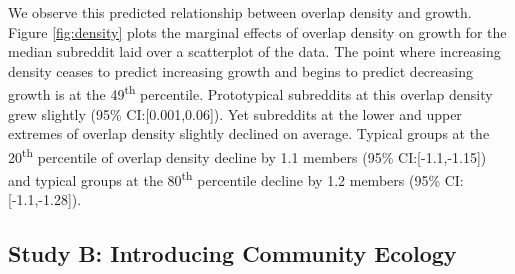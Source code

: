 \documentclass[letterpaper]{article}\usepackage[]{graphicx}\usepackage[]{color}
\begin{document}
We observe this predicted relationship between overlap density and growth. Figure \ref{fig:density} plots the marginal effects of overlap density on growth for the median subreddit laid over a scatterplot of the data.
The point where increasing density ceases to predict increasing growth and begins to predict decreasing growth is at the 49\textsuperscript{th} percentile. 
Prototypical subreddits at this overlap density grew slightly (95\% CI:[0.001,0.06]).  Yet subreddits at the lower and upper extremes of overlap density slightly declined on average. Typical groups at the 20\textsuperscript{th} percentile of overlap density decline by 1.1 members (95\% CI:[-1.1,-1.15]) and typical groups at the 80\textsuperscript{th} percentile decline by 1.2 members (95\% CI:[-1.1,-1.28]). 



\subsection{Study B: Introducing Community Ecology}
\label{sec:res.characterizing}




\end{document}
